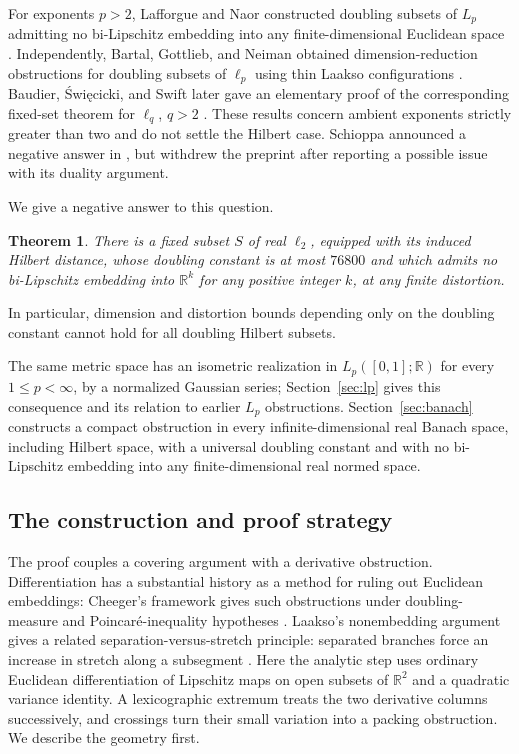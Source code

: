 \documentclass[11pt]{article}
\newtheorem{theorem}{Theorem}
\newcommand{\R}{\mathbb R}
\begin{document}
For exponents $p>2$, Lafforgue and Naor constructed doubling subsets of $L_p$ admitting no bi-Lipschitz embedding into any finite-dimensional Euclidean space \cite[Theorem 1.1]{LN}. Independently, Bartal, Gottlieb, and Neiman obtained dimension-reduction obstructions for doubling subsets of $\ell_p$ using thin Laakso configurations \cite{BGN}. Baudier, \'Swi\k{e}cicki, and Swift later gave an elementary proof of the corresponding fixed-set theorem for $\ell_q$, $q>2$ \cite[Theorem 1]{BSS}. These results concern ambient exponents strictly greater than two and do not settle the Hilbert case. Schioppa announced a negative answer in \cite{Schioppa}, but withdrew the preprint after reporting a possible issue with its duality argument.

We give a negative answer to this question.
\begin{theorem}\label{thm:main}
There is a fixed subset $S$ of real $\ell_2$, equipped with its induced Hilbert distance, whose doubling constant is at most $76800$ and which admits no bi-Lipschitz embedding into $\R^k$ for any positive integer $k$, at any finite distortion.
\end{theorem}
In particular, dimension and distortion bounds depending only on the doubling constant cannot hold for all doubling Hilbert subsets.

The same metric space has an isometric realization in $L_p([0,1];\R)$ for every $1\le p<\infty$, by a normalized Gaussian series; Section~\ref{sec:lp} gives this consequence and its relation to earlier $L_p$ obstructions. Section~\ref{sec:banach} constructs a compact obstruction in every infinite-dimensional real Banach space, including Hilbert space, with a universal doubling constant and with no bi-Lipschitz embedding into any finite-dimensional real normed space.

\subsection{The construction and proof strategy}
The proof couples a covering argument with a derivative obstruction. Differentiation has a substantial history as a method for ruling out Euclidean embeddings: Cheeger's framework gives such obstructions under doubling-measure and Poincar\'e-inequality hypotheses \cite[Section 14, Theorem 14.3]{Cheeger}. Laakso's nonembedding argument gives a related separation-versus-stretch principle: separated branches force an increase in stretch along a subsegment \cite[Section 4, Theorem 4.1]{Laakso}. Here the analytic step uses ordinary Euclidean differentiation of Lipschitz maps on open subsets of $\R^2$ and a quadratic variance identity. A lexicographic extremum treats the two derivative columns successively, and crossings turn their small variation into a packing obstruction. We describe the geometry first.
\end{document}
